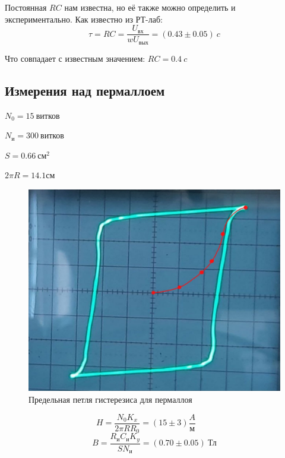 \documentclass[a4paper]{article}
\begin{document}
Постоянная $RC$ нам известна, но её также можно определить и экспериментально.
Как известно из РТ-лаб:
\begin{equation}
    \tau = RC = \frac{U_\text{вх}}{wU_\text{вых}} = (0.43 \pm 0.05) \ c
\end{equation}

Что совпадает с известным значением: $RC = 0.4 \ c$

\newpage

\subsection{Измерения над пермаллоем}
$N_0 = 15 \ \text{витков}$

$N_\text{и} = 300 \ \text{витков}$

$S = 0.66 \ \text{см}^2$

$2 \pi R = 14.1 \text{см}$

\begin{figure}[h!]
    \centering
    \includegraphics[width=0.5\pdfpagewidth]{12.jpg}
    \caption{Предельная петля гистерезиса для пермаллоя}
\end{figure}

\begin{equation*}
    H = \frac{N_0 K_x}{2\pi RR_0} = (15 \pm 3) \frac{A}{\text{м}} \qquad 
\end{equation*}
\begin{equation*}
    B = \frac{R_\text{и} C_\text{и} K_y}{S N_\text{и}} = (0.70 \pm 0.05) \ \text{Тл}
\end{equation*}
\end{document}
